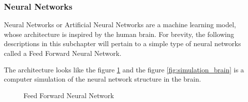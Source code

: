     \subsubsection{Neural Networks}

    Neural Networks or Artificial Neural Networks are a machine learning model, whose architecture is inspired by the human brain. For brevity, the following descriptions in this subchapter will pertain to a simple type of neural networks called a Feed Forward Neural Network.
    
    The architecture looks like the figure \ref{fig:ffnn} and the figure \ref{fig:simulation_brain} is a computer simulation of the neural network structure in the brain.


\noindent
\begin{figure}
\centering
{}
\caption{Feed Forward Neural Network \cite{tikz_neural_networks}}
\label{fig:ffnn}
\end{figure}


